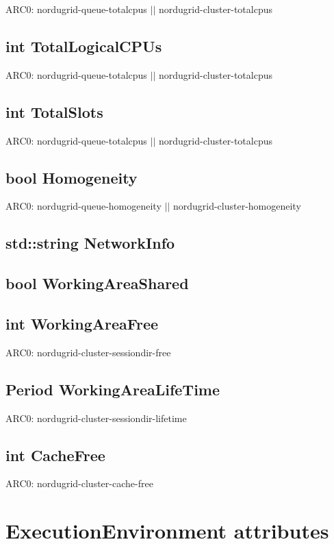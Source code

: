 \documentclass{book}
\begin{document}
ARC0: nordugrid-queue-totalcpus $||$ nordugrid-cluster-totalcpus

\subsection*{int TotalLogicalCPUs}

ARC0: nordugrid-queue-totalcpus $||$ nordugrid-cluster-totalcpus

\subsection*{int TotalSlots}

ARC0: nordugrid-queue-totalcpus $||$ nordugrid-cluster-totalcpus

\subsection*{bool Homogeneity}

ARC0: nordugrid-queue-homogeneity $||$ nordugrid-cluster-homogeneity

\subsection*{std::string NetworkInfo}

\subsection*{bool WorkingAreaShared}

\subsection*{int WorkingAreaFree}

ARC0: nordugrid-cluster-sessiondir-free

\subsection*{Period WorkingAreaLifeTime}

ARC0: nordugrid-cluster-sessiondir-lifetime

\subsection*{int CacheFree}

ARC0: nordugrid-cluster-cache-free

\section{ExecutionEnvironment attributes}
\end{document}
